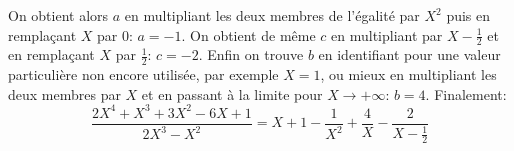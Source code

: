 {\begin{enumerate}
{On obtient alors $a$ en multipliant les deux membres de l'égalité par
$X^2$ puis en remplaçant $X$ par 0: $a=-1$. On obtient de
m\^eme $c$ en multipliant par $X-\frac{1}{2}$ et en remplaçant $X$
par $\frac{1}{2}$: $c=-2$. Enfin on trouve $b$ en identifiant pour une
valeur particuli\`ere non encore utilisée, par exemple $X=1$, ou mieux en
multipliant les deux membres par $X$ et en passant \`a la limite pour
$X\to+\infty$: $b=4$. Finalement:
$$\frac{2X^4+X^3+3X^2-6X+1}{2X^3-X^2}=X+1-\frac{1}{X^2}+\frac{4}{X}-\frac{2}{X-\frac{1}{2}}$$
}
\end{enumerate}
}
